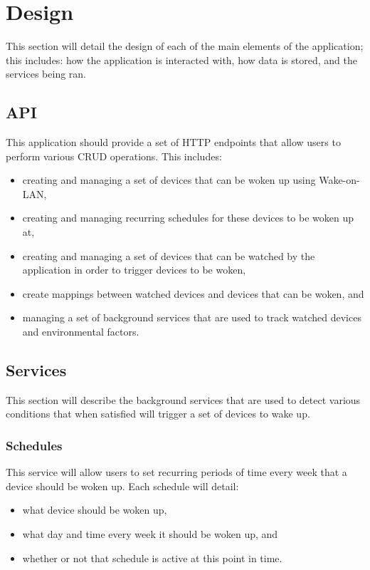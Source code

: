 
\section{Design}

This section will detail the design of each of the main elements of the application; this includes: how the application is interacted with, how data is stored, and the services being ran.

\subsection{API}

This application should provide a set of HTTP endpoints that allow users to perform various CRUD operations. This includes:

\begin{itemize}
    \item creating and managing a set of devices that can be woken up using Wake-on-LAN,
    \item creating and managing recurring schedules for these devices to be woken up at,
    \item creating and managing a set of devices that can be watched by the application in order to trigger devices to be woken,
    \item create mappings between watched devices and devices that can be woken, and
    \item managing a set of background services that are used to track watched devices and environmental factors.
\end{itemize}

\subsection{Services}\label{subsec:services}

This section will describe the background services that are used to detect various conditions that when satisfied will trigger a set of devices to wake up. 

\vspace{2mm}
\subsubsection{Schedules}

This service will allow users to set recurring periods of time every week that a device should be woken up. Each schedule will detail:

\begin{itemize}[noitemsep]
    \item what device should be woken up,
    \item what day and time every week it should be woken up, and
    \item whether or not that schedule is active at this point in time.
\end{itemize}

